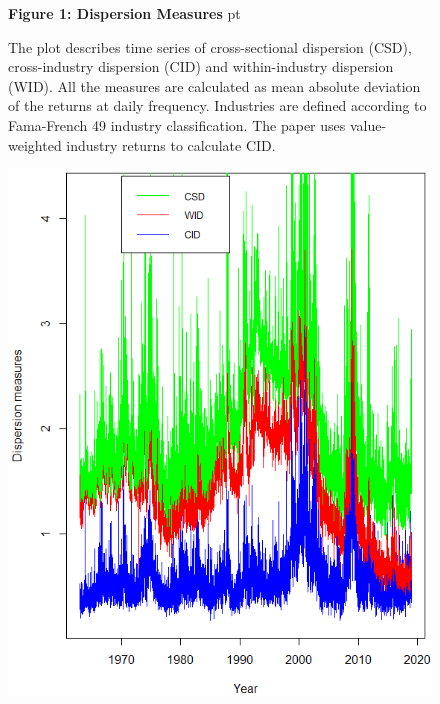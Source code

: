 \documentclass[12pt]{article}
\begin{document}
\begin{figure}
\textbf{Figure 1: Dispersion Measures}
 pt
\begin{flushleft}
{The plot describes time series of cross-sectional dispersion (CSD), cross-industry dispersion (CID) and within-industry dispersion (WID). All the measures are calculated as mean absolute deviation of the returns at daily frequency. Industries are defined according to Fama-French 49 industry classification. The paper uses value-weighted industry returns to calculate CID.}
\end{flushleft}
\centering
\includegraphics[width=1\textwidth]{fig1.png}
\end{figure}
\end{document}
